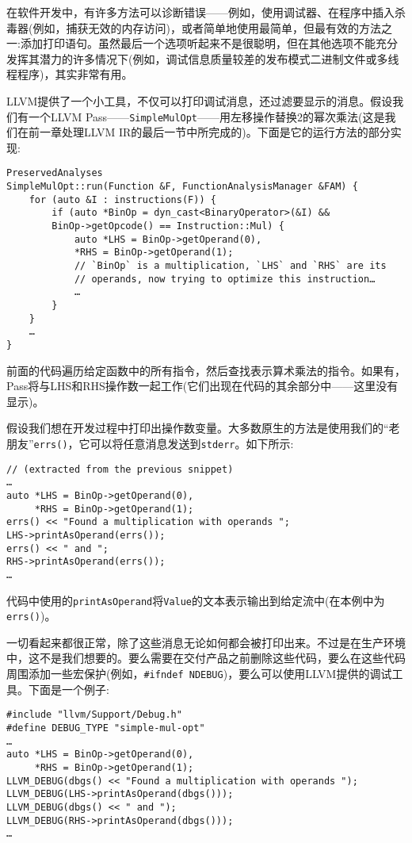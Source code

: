 在软件开发中，有许多方法可以诊断错误——例如，使用调试器、在程序中插入杀毒器(例如，捕获无效的内存访问)，或者简单地使用最简单，但最有效的方法之一:添加打印语句。虽然最后一个选项听起来不是很聪明，但在其他选项不能充分发挥其潜力的许多情况下(例如，调试信息质量较差的发布模式二进制文件或多线程程序)，其实非常有用。

LLVM提供了一个小工具，不仅可以打印调试消息，还过滤要显示的消息。假设我们有一个LLVM Pass——\texttt{SimpleMulOpt}——用左移操作替换2的幂次乘法(这是我们在前一章处理LLVM IR的最后一节中所完成的)。下面是它的运行方法的部分实现:

\begin{lstlisting}[style=styleCXX]
PreservedAnalyses
SimpleMulOpt::run(Function &F, FunctionAnalysisManager &FAM) {
	for (auto &I : instructions(F)) {
		if (auto *BinOp = dyn_cast<BinaryOperator>(&I) &&
		BinOp->getOpcode() == Instruction::Mul) {
			auto *LHS = BinOp->getOperand(0),
			*RHS = BinOp->getOperand(1);
			// `BinOp` is a multiplication, `LHS` and `RHS` are its
			// operands, now trying to optimize this instruction…
			…
		}
	}
	…
}
\end{lstlisting}

前面的代码遍历给定函数中的所有指令，然后查找表示算术乘法的指令。如果有，Pass将与LHS和RHS操作数一起工作(它们出现在代码的其余部分中——这里没有显示)。

假设我们想在开发过程中打印出操作数变量。大多数原生的方法是使用我们的“老朋友”\texttt{errs()}，它可以将任意消息发送到\texttt{stderr}。如下所示:

\begin{lstlisting}[style=styleCXX]
// (extracted from the previous snippet)
…
auto *LHS = BinOp->getOperand(0),
     *RHS = BinOp->getOperand(1);
errs() << "Found a multiplication with operands ";
LHS->printAsOperand(errs());
errs() << " and ";
RHS->printAsOperand(errs());
…
\end{lstlisting}

代码中使用的\texttt{printAsOperand}将\texttt{Value}的文本表示输出到给定流中(在本例中为\texttt{errs()})。

一切看起来都很正常，除了这些消息无论如何都会被打印出来。不过是在生产环境中，这不是我们想要的。要么需要在交付产品之前删除这些代码，要么在这些代码周围添加一些宏保护(例如，\texttt{\#ifndef NDEBUG})，要么可以使用LLVM提供的调试工具。下面是一个例子:

\begin{lstlisting}[style=styleCXX]
#include "llvm/Support/Debug.h"
#define DEBUG_TYPE "simple-mul-opt"
…
auto *LHS = BinOp->getOperand(0),
     *RHS = BinOp->getOperand(1);
LLVM_DEBUG(dbgs() << "Found a multiplication with operands ");
LLVM_DEBUG(LHS->printAsOperand(dbgs()));
LLVM_DEBUG(dbgs() << " and ");
LLVM_DEBUG(RHS->printAsOperand(dbgs()));
…
\end{lstlisting}

